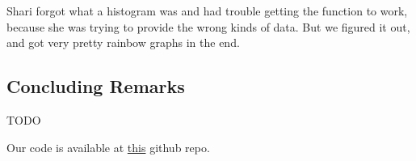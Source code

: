 Shari forgot what a histogram was and had trouble getting the function to work, because she was trying to provide the wrong kinds of data.  But we figured it out, and got very pretty rainbow graphs in the end.

\subsection{Concluding Remarks}
TODO

Our code is available at \href{https://github.com/carlyrobison/MovieLensVis/}{this} github repo.







